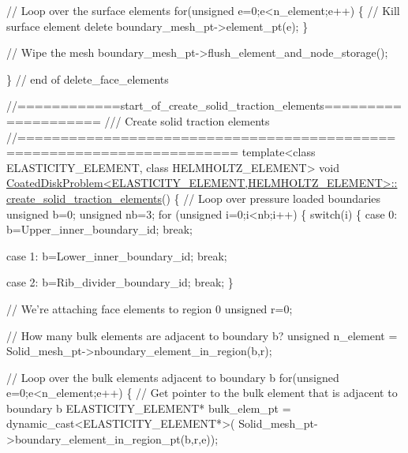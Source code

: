 \begin{DoxyCodeInclude}
{ \textcolor{comment}{// Loop over the surface elements}
 \textcolor{keywordflow}{for}(\textcolor{keywordtype}{unsigned} e=0;e<n\_element;e++)
  \{
   \textcolor{comment}{//   Kill surface element}
   \textcolor{keyword}{delete} boundary\_mesh\_pt->element\_pt(e);
  \}
 
 \textcolor{comment}{// Wipe the mesh}
 boundary\_mesh\_pt->flush\_element\_and\_node\_storage();
 
\} \textcolor{comment}{// end of delete\_face\_elements}



\textcolor{comment}{//============start\_of\_create\_solid\_traction\_elements====================}\textcolor{comment}{}
\textcolor{comment}{/// Create solid traction elements }
\textcolor{comment}{}\textcolor{comment}{//=======================================================================}
\textcolor{keyword}{template}<\textcolor{keyword}{class} ELASTICITY\_ELEMENT, \textcolor{keyword}{class} HELMHOLTZ\_ELEMENT>
\textcolor{keywordtype}{void} \hyperlink{classCoatedDiskProblem_a31c3707de78a720e3936e3b34e70b1ba}{CoatedDiskProblem<ELASTICITY\_ELEMENT,HELMHOLTZ\_ELEMENT>::}
\hyperlink{classCoatedDiskProblem_a31c3707de78a720e3936e3b34e70b1ba}{create\_solid\_traction\_elements}()
\{
 \textcolor{comment}{// Loop over pressure loaded boundaries}
 \textcolor{keywordtype}{unsigned} b=0;
 \textcolor{keywordtype}{unsigned} nb=3;
 \textcolor{keywordflow}{for} (\textcolor{keywordtype}{unsigned} i=0;i<nb;i++) 
  \{
   \textcolor{keywordflow}{switch}(i)
    \{
    \textcolor{keywordflow}{case} 0:
     b=Upper\_inner\_boundary\_id;
     \textcolor{keywordflow}{break};
     
    \textcolor{keywordflow}{case} 1:
     b=Lower\_inner\_boundary\_id;
     \textcolor{keywordflow}{break};
     
    \textcolor{keywordflow}{case} 2:
     b=Rib\_divider\_boundary\_id;
     \textcolor{keywordflow}{break};
    \}
   
   \textcolor{comment}{// We're attaching face elements to region 0}
   \textcolor{keywordtype}{unsigned} r=0;
   
   \textcolor{comment}{// How many bulk elements are adjacent to boundary b?}
   \textcolor{keywordtype}{unsigned} n\_element = Solid\_mesh\_pt->nboundary\_element\_in\_region(b,r);
   
   \textcolor{comment}{// Loop over the bulk elements adjacent to boundary b}
   \textcolor{keywordflow}{for}(\textcolor{keywordtype}{unsigned} e=0;e<n\_element;e++)
    \{
     \textcolor{comment}{// Get pointer to the bulk element that is adjacent to boundary b}
     ELASTICITY\_ELEMENT* bulk\_elem\_pt = \textcolor{keyword}{dynamic\_cast<}ELASTICITY\_ELEMENT*\textcolor{keyword}{>}(
      Solid\_mesh\_pt->boundary\_element\_in\_region\_pt(b,r,e));
     
}
\end{DoxyCodeInclude}
